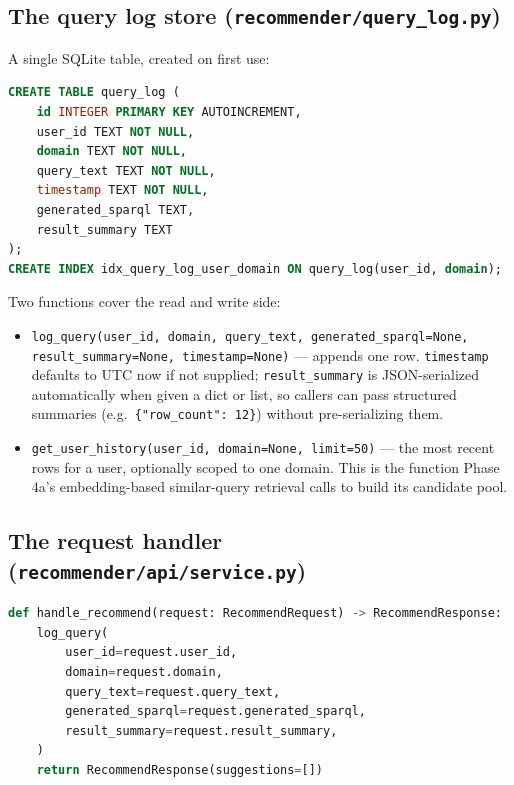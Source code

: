 \documentclass[11pt,a4paper]{article}
\newcommand{\code}[1]{\texttt{#1}}
\begin{document}
\subsection{The query log store (\code{recommender/query\_log.py})}

A single SQLite table, created on first use:

\begin{lstlisting}[language=SQL, caption={The query log schema. SQLite was chosen deliberately
over Postgres: a single-file, zero-infrastructure store is appropriate for a thesis-scale log that
does not need to be shared across processes beyond one local API server, consistent with the
project's existing pattern of using the lightest tool that fits (e.g.\ JSON-per-user files in
Phase 3, not a database).}]
CREATE TABLE query_log (
    id INTEGER PRIMARY KEY AUTOINCREMENT,
    user_id TEXT NOT NULL,
    domain TEXT NOT NULL,
    query_text TEXT NOT NULL,
    timestamp TEXT NOT NULL,
    generated_sparql TEXT,
    result_summary TEXT
);
CREATE INDEX idx_query_log_user_domain ON query_log(user_id, domain);
\end{lstlisting}

Two functions cover the read and write side:

\begin{itemize}
    \item \code{log\_query(user\_id, domain, query\_text, generated\_sparql=None,
        result\_summary=None, timestamp=None)} --- appends one row. \code{timestamp} defaults to
        UTC now if not supplied; \code{result\_summary} is JSON-serialized automatically when
        given a dict or list, so callers can pass structured summaries (e.g.\
        \code{\{"row\_count": 12\}}) without pre-serializing them.
    \item \code{get\_user\_history(user\_id, domain=None, limit=50)} --- the most recent rows for
        a user, optionally scoped to one domain. This is the function Phase 4a's
        embedding-based similar-query retrieval calls to build its candidate pool.
\end{itemize}

\subsection{The request handler (\code{recommender/api/service.py})}

\begin{lstlisting}[language=Python, caption={\code{handle\_recommend()} as implemented in Phase 2
--- validate and persist only. Phase 4 replaces the final line with the real retrieval $\to$ LLM
generation $\to$ schema-validation $\to$ ranking pipeline, without changing this function's
signature.}]
def handle_recommend(request: RecommendRequest) -> RecommendResponse:
    log_query(
        user_id=request.user_id,
        domain=request.domain,
        query_text=request.query_text,
        generated_sparql=request.generated_sparql,
        result_summary=request.result_summary,
    )
    return RecommendResponse(suggestions=[])
\end{lstlisting}
\end{document}
